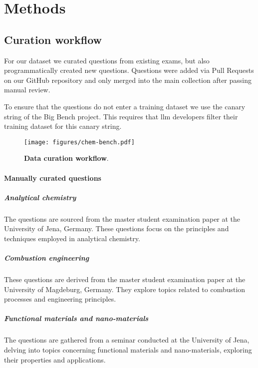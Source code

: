\documentclass[11pt, oneside]{article}
\begin{document}



\section{Methods}

\subsection{Curation workflow}\label{sec:curation}
For our dataset we curated questions from existing exams, but also programmatically created new questions.
Questions were added via Pull Requests on our GitHub repository and only merged into the main collection after passing manual review.

To ensure that the questions do not enter a training dataset we use the canary string of the Big Bench project.
This requires that \Gls{llm} developers filter their training dataset for this canary string.

\begin{figure}
    \texttt{[image: figures/chem-bench.pdf]}
    \caption{\textbf{Data curation workflow}.}
\end{figure}

\paragraph{Manually curated questions}

\subparagraph{Analytical chemistry}
The questions are sourced from the master student examination paper at the University of Jena, Germany. These questions focus on the principles and techniques employed in analytical chemistry.

\subparagraph{Combustion engineering}
These questions are derived from the master student examination paper at the University of Magdeburg, Germany. They explore topics related to combustion processes and engineering principles.

\subparagraph{Functional materials and nano-materials}
The questions are gathered from a seminar conducted at the University of Jena, delving into topics concerning functional materials and nano-materials, exploring their properties and applications.
\end{document}
